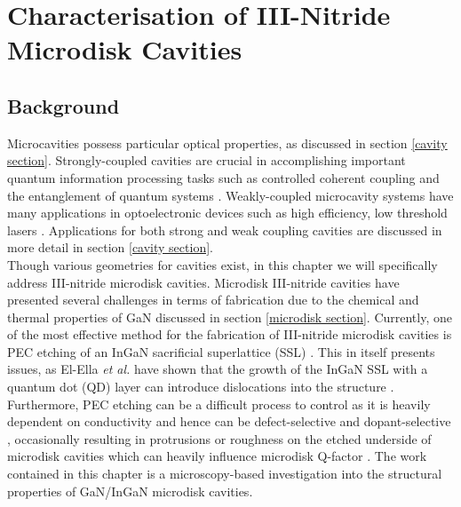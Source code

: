
\chapter{Characterisation of III-Nitride Microdisk Cavities}
\label{Microdisk Chapter}
\ifpdf
    \graphicspath{{Chapter2/Figs/Raster/}{Chapter2/Figs/PDF/}{Chapter2/Figs/}}
\else
    \graphicspath{{Chapter2/Figs/Vector/}{Chapter2/Figs/}}
\fi


\section[Background]{Background}

Microcavities possess particular optical properties, as discussed in section \ref{cavity section}. Strongly-coupled cavities are crucial in accomplishing important quantum information processing tasks such as controlled coherent coupling and the entanglement of quantum systems \cite{Hennessy2007}. Weakly-coupled microcavity systems have many applications in optoelectronic devices such as high efficiency, low threshold lasers \cite{Vahala2003}. Applications for both strong and weak coupling cavities are discussed in more detail in section \ref{cavity section}.
\\ Though various geometries for cavities exist, in this chapter we will specifically address III-nitride microdisk cavities. Microdisk III-nitride cavities have presented several challenges in terms of fabrication due to the chemical and thermal properties of GaN discussed in section \ref{microdisk section}. Currently, one of the most effective method for the fabrication of III-nitride microdisk cavities is PEC etching of an InGaN sacrificial superlattice  (SSL) \cite{Puchtler2015}. This in itself presents issues, as El-Ella \textit{et al.} have shown that the growth of the InGaN SSL with a quantum dot (QD) layer can introduce dislocations into the structure \cite{El-Ella2011a}. Furthermore, PEC etching can be a difficult process to control as it is heavily dependent on conductivity and hence can be defect-selective \cite{Visconti2001,Youtsey1999,Youtsey1998} and dopant-selective \cite{Youtsey1999}, occasionally resulting in protrusions or roughness \cite{Puchtler2015} on the etched underside of microdisk cavities which can heavily influence microdisk Q-factor \cite{Puchtler2015}. The work contained in this chapter is a microscopy-based investigation into the structural properties of GaN/InGaN microdisk cavities.

